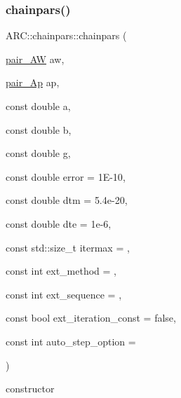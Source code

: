 \subsubsection{\texorpdfstring{chainpars()}{chainpars()}\hspace{0.1cm}{\footnotesize\ttfamily [2/2]}}
{\footnotesize\ttfamily A\+R\+C\+::chainpars\+::chainpars (\begin{DoxyParamCaption}\item[{\hyperlink{namespaceARC_a5c4308ca4a8d0e0ff59fdce30f00274c}{pair\+\_\+\+AW}}]{aw,  }\item[{\hyperlink{namespaceARC_aed8f19a0c6ae7dc0bb3696b337d7b9f6}{pair\+\_\+\+Ap}}]{ap,  }\item[{const double}]{a,  }\item[{const double}]{b,  }\item[{const double}]{g,  }\item[{const double}]{error = {\ttfamily 1E-\/10},  }\item[{const double}]{dtm = {\ttfamily 5.4e-\/20},  }\item[{const double}]{dte = {\ttfamily 1e-\/6},  }\item[{const std\+::size\+\_\+t}]{itermax = {},  }\item[{const int}]{ext\+\_\+method = {},  }\item[{const int}]{ext\+\_\+sequence = {},  }\item[{const bool}]{ext\+\_\+iteration\+\_\+const = {\ttfamily false},  }\item[{const int}]{auto\+\_\+step\+\_\+option = {} }\end{DoxyParamCaption})\hspace{0.3cm}{\ttfamily [inline]}}



constructor 


